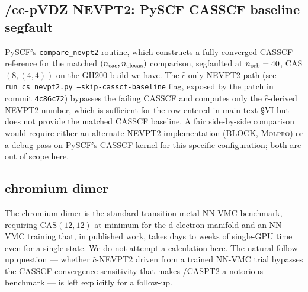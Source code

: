 \documentclass[journal=jctcce,manuscript=suppinfo,layout=traditional]{achemso}
\begin{document}
\subsection{/cc-pVDZ NEVPT2: PySCF CASSCF baseline segfault}

PySCF's \texttt{compare\_nevpt2} routine, which constructs a
fully-converged CASSCF reference for the matched
$(n_{\rm cas}, n_{\rm elecas})$ comparison, segfaulted at $n_{\rm
orb}=40$, CAS$(8,(4,4))$ on the GH200 build we have. The
$\widehat c$-only NEVPT2 path (see
\texttt{run\_cs\_nevpt2.py --skip-casscf-baseline} flag, exposed by
the patch in commit \texttt{4c86c72}) bypasses the failing CASSCF and
computes only the $\widehat c$-derived NEVPT2 number, which is
sufficient for the row entered in main-text §VI but does not provide
the matched CASSCF baseline. A fair side-by-side comparison would
require either an alternate NEVPT2 implementation (BLOCK,
\textsc{Molpro}) or a debug pass on PySCF's CASSCF kernel for this
specific configuration; both are out of scope here.

\subsection{ chromium dimer}

The chromium dimer is the standard transition-metal NN-VMC
benchmark, requiring CAS$(12,12)$ at minimum for the d-electron
manifold and an NN-VMC training that, in published work, takes days
to weeks of single-GPU time even for a single state. We do not
attempt a  calculation here. The natural follow-up question
--- whether $\widehat c$-NEVPT2 driven from a trained 
NN-VMC trial bypasses the CASSCF convergence sensitivity that makes
/CASPT2 a notorious benchmark --- is left explicitly for a
follow-up.
\end{document}
